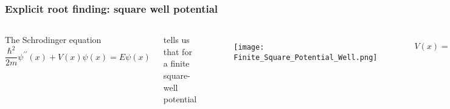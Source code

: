 \documentclass[hyperref={colorlinks=true}]{beamer}
\begin{document}
\begin{frame}[shrink=20]
  \frametitle{Explicit root finding: square well potential}

  \begin{columns}
  
    
  The Schrodinger equation  
  \begin{equation}
    \frac{\hbar^2}{2m}\psi^{\prime\prime}(x) + V(x)\psi(x) = E\psi(x)
  \end{equation}
  
  \pause
  
  tells us that for a finite square-well potential
  
  \begin{figure}
    \texttt{[image: Finite\_Square\_Potential\_Well.png]}
  \end{figure}
  
  \vspace{-0.5cm}
  
  \begin{equation}
    V(x) = \begin{cases}  
             -V_0 & 0 < x < L \\
             0    & \mathrm{else}
           \end{cases}
  \end{equation}
  
  \pause
  
  and a bound state ($E=-f<0$, $f$ positive definite) in the region $x<0$, we must solve:
  
  \begin{equation}
    -\frac{\hbar^2}{2m}\psi^{\prime\prime}(x<0) = -f\psi(x<0)
  \end{equation}
    

  \pause
  The solution for $x<0$ is
  \begin{equation}
    \psi(x<0) = A e^{\sqrt{z_0^2 - z^2}\, x}, \mathrm{where} \, z_0^2 - z^2 = \frac{2mf}{\hbar^2}
  \end{equation}
  
  and $z_0^2 \equiv 2mV_0/\hbar^2$.

  \pause

  In order to solve for the bound-state energies, we need to solve the following
  \begin{equation}
    \tan(zL) = \frac{2 \sqrt{ \left( \frac{z_0}{z} \right)^2 - 1 } }{ 2 - \left( \frac{z_0}{z} \right)^2 }
  \end{equation}
  
  \pause
  
  This is transcendental, requires numerical approaches to finding the  of
  \begin{equation}
    F(z) = \tan(zL) - \frac{2 \sqrt{ \left( \frac{z_0}{z} \right)^2 - 1 } }{ 2 - \left( \frac{z_0}{z} \right)^2 }
  \end{equation}
  
  
  
  \end{columns}

\end{frame}
\end{document}
